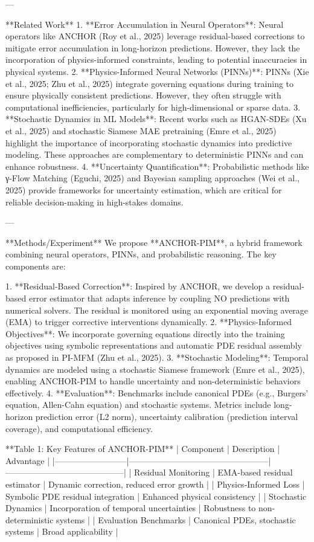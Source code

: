 ---

**Related Work**  
1. **Error Accumulation in Neural Operators**: Neural operators like ANCHOR (Roy et al., 2025) leverage residual-based corrections to mitigate error accumulation in long-horizon predictions. However, they lack the incorporation of physics-informed constraints, leading to potential inaccuracies in physical systems.  
2. **Physics-Informed Neural Networks (PINNs)**: PINNs (Xie et al., 2025; Zhu et al., 2025) integrate governing equations during training to ensure physically consistent predictions. However, they often struggle with computational inefficiencies, particularly for high-dimensional or sparse data.  
3. **Stochastic Dynamics in ML Models**: Recent works such as HGAN-SDEs (Xu et al., 2025) and stochastic Siamese MAE pretraining (Emre et al., 2025) highlight the importance of incorporating stochastic dynamics into predictive modeling. These approaches are complementary to deterministic PINNs and can enhance robustness.  
4. **Uncertainty Quantification**: Probabilistic methods like γ-Flow Matching (Eguchi, 2025) and Bayesian sampling approaches (Wei et al., 2025) provide frameworks for uncertainty estimation, which are critical for reliable decision-making in high-stakes domains.

---

**Methods/Experiment**  
We propose **ANCHOR-PIM**, a hybrid framework combining neural operators, PINNs, and probabilistic reasoning. The key components are:

1. **Residual-Based Correction**: Inspired by ANCHOR, we develop a residual-based error estimator that adapts inference by coupling NO predictions with numerical solvers. The residual is monitored using an exponential moving average (EMA) to trigger corrective interventions dynamically.  
2. **Physics-Informed Objectives**: We incorporate governing equations directly into the training objectives using symbolic representations and automatic PDE residual assembly as proposed in PI-MFM (Zhu et al., 2025).  
3. **Stochastic Modeling**: Temporal dynamics are modeled using a stochastic Siamese framework (Emre et al., 2025), enabling ANCHOR-PIM to handle uncertainty and non-deterministic behaviors effectively.  
4. **Evaluation**: Benchmarks include canonical PDEs (e.g., Burgers' equation, Allen-Cahn equation) and stochastic systems. Metrics include long-horizon prediction error (L2 norm), uncertainty calibration (prediction interval coverage), and computational efficiency.

**Table 1: Key Features of ANCHOR-PIM**  
| Component                | Description                                      | Advantage                                |
|--------------------------|--------------------------------------------------|------------------------------------------|
| Residual Monitoring      | EMA-based residual estimator                    | Dynamic correction, reduced error growth |
| Physics-Informed Loss    | Symbolic PDE residual integration               | Enhanced physical consistency            |
| Stochastic Dynamics      | Incorporation of temporal uncertainties         | Robustness to non-deterministic systems  |
| Evaluation Benchmarks    | Canonical PDEs, stochastic systems              | Broad applicability                      |

